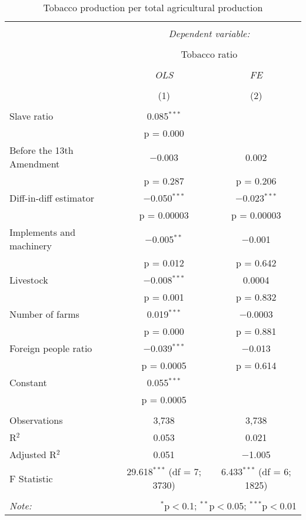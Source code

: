 \documentclass[12pt]{report}
\begin{document}
\begin{table}[!htbp] \centering 
  \caption{Tobacco production per total agricultural production} 
  \label{tab:tobnopop} 
\begin{tabular}{@{\extracolsep{5pt}}lcc} 
\\[-1.8ex]\hline 
\hline \\[-1.8ex] 
 & \multicolumn{2}{c}{\textit{Dependent variable:}} \\ 
\cline{2-3} 
\\[-1.8ex] & \multicolumn{2}{c}{Tobacco ratio} \\ 
\\[-1.8ex] & \textit{OLS} & \textit{FE} \\ 
\\[-1.8ex] & (1) & (2)\\ 
\hline \\[-1.8ex] 
 Slave ratio & 0.085$^{***}$ &  \\ 
  & p = 0.000 &  \\ 
  Before the 13th Amendment & $-$0.003 & 0.002 \\ 
  & p = 0.287 & p = 0.206 \\ 
  Diff-in-diff estimator & $-$0.050$^{***}$ & $-$0.023$^{***}$ \\ 
  & p = 0.00003 & p = 0.00003 \\ 
  Implements and machinery & $-$0.005$^{**}$ & $-$0.001 \\ 
  & p = 0.012 & p = 0.642 \\ 
  Livestock & $-$0.008$^{***}$ & 0.0004 \\ 
  & p = 0.001 & p = 0.832 \\ 
  Number of farms & 0.019$^{***}$ & $-$0.0003 \\ 
  & p = 0.000 & p = 0.881 \\ 
  Foreign people ratio & $-$0.039$^{***}$ & $-$0.013 \\ 
  & p = 0.0005 & p = 0.614 \\ 
  Constant & 0.055$^{***}$ &  \\ 
  & p = 0.0005 &  \\ 
 \hline \\[-1.8ex] 
Observations & 3,738 & 3,738 \\ 
R$^{2}$ & 0.053 & 0.021 \\ 
Adjusted R$^{2}$ & 0.051 & $-$1.005 \\ 
F Statistic & 29.618$^{***}$ (df = 7; 3730) & 6.433$^{***}$ (df = 6; 1825) \\ 
\hline 
\hline \\[-1.8ex] 
\textit{Note:}  & \multicolumn{2}{r}{$^{*}$p$<$0.1; $^{**}$p$<$0.05; $^{***}$p$<$0.01} \\ 
\end{tabular} 
\end{table}  
\end{document}
